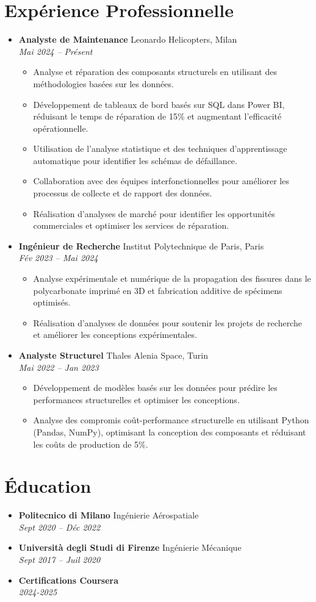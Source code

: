 \documentclass[letterpaper,10.5pt]{article}
\newcommand{\resumeEntry}[4]{
  \item\textbf{#1} \hfill #2\\
  \textit{#3} \hfill \textit{#4}
}
\newcommand{\resumeDescription}[1]{
  \vspace{-2pt}\begin{itemize}[leftmargin=0.2in]
    #1
  \end{itemize}
}
\begin{document}
\section*{Expérience Professionnelle}\vspace{-5pt}
\begin{itemize}[leftmargin=0.2in]
    \resumeEntry{Analyste de Maintenance}{Leonardo Helicopters, Milan}{Mai 2024 -- Présent}{}
    \resumeDescription{
        \item Analyse et réparation des composants structurels en utilisant des méthodologies basées sur les données.
        \item Développement de tableaux de bord basés sur SQL dans Power BI, réduisant le temps de réparation de 15\% et augmentant l'efficacité opérationnelle.
        \item Utilisation de l'analyse statistique et des techniques d'apprentissage automatique pour identifier les schémas de défaillance.
        \item Collaboration avec des équipes interfonctionnelles pour améliorer les processus de collecte et de rapport des données.
        \item Réalisation d'analyses de marché pour identifier les opportunités commerciales et optimiser les services de réparation.
    }
    \resumeEntry{Ingénieur de Recherche}{Institut Polytechnique de Paris, Paris}{Fév 2023 -- Mai 2024}{}
    \resumeDescription{
        \item Analyse expérimentale et numérique de la propagation des fissures dans le polycarbonate imprimé en 3D et fabrication additive de spécimens optimisés.
        \item Réalisation d'analyses de données pour soutenir les projets de recherche et améliorer les conceptions expérimentales.
    }
    \resumeEntry{Analyste Structurel}{Thales Alenia Space, Turin}{Mai 2022 -- Jan 2023}{}
    \resumeDescription{
        \item Développement de modèles basés sur les données pour prédire les performances structurelles et optimiser les conceptions.
        \item Analyse des compromis coût-performance structurelle en utilisant Python (Pandas, NumPy), optimisant la conception des composants et réduisant les coûts de production de 5\%.
    }
\end{itemize}

\section*{Éducation}\vspace{-5pt}
\begin{itemize}[leftmargin=0.2in]
    \resumeEntry{Politecnico di Milano}{Ingénierie Aérospatiale}{Sept 2020 -- Déc 2022}{}
    \resumeEntry{Università degli Studi di Firenze}{Ingénierie Mécanique}{Sept 2017 -- Juil 2020}{}
    \resumeEntry{Certifications Coursera}{}{2024-2025}{}
\end{itemize}
\end{document}

